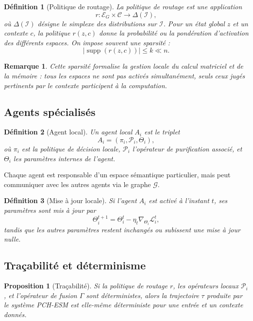 \documentclass[11pt,a4paper]{article}
\newtheorem{definition}{Définition}[section]
\newtheorem{proposition}{Proposition}[section]
\newtheorem{remark}{Remarque}[section]
\DeclareMathOperator{\supp}{supp}
\newcommand{\C}{\mathcal C}
\newcommand{\E}{\mathcal E}
\newcommand{\I}{\mathcal I}
\newcommand{\Pcal}{\mathcal P}
\newcommand{\Gcal}{\mathcal G}
\newcommand{\1}{\mathbf 1}
\begin{document}
\begin{definition}[Politique de routage]
La politique de routage est une application
\[
r:\E_G\times\C\to\Delta(\I),
\]
où \(\Delta(\I)\) désigne le simplexe des distributions sur \(\I\).
Pour un état global \(z\) et un contexte \(c\), la politique \(r(z,c)\) donne la probabilité ou la pondération d'activation des différents espaces.
On impose souvent une sparsité :
\[
|\supp(r(z,c))|\le k\ll n.
\]
\end{definition}

\begin{remark}
Cette sparsité formalise la gestion locale du calcul matriciel et de la mémoire : tous les espaces ne sont pas activés simultanément, seuls ceux jugés pertinents par le contexte participent à la computation.
\end{remark}

\subsection{Agents spécialisés}

\begin{definition}[Agent local]
Un agent local \(A_i\) est le triplet
\[
A_i=(\pi_i,\Pcal_i,\Theta_i),
\]
où \(\pi_i\) est la politique de décision locale, \(\Pcal_i\) l'opérateur de purification associé, et \(\Theta_i\) les paramètres internes de l'agent.
\end{definition}

Chaque agent est responsable d'un espace sémantique particulier, mais peut communiquer avec les autres agents via le graphe \(\Gcal\).

\begin{definition}[Mise à jour locale]
Si l'agent \(A_i\) est activé à l'instant \(t\), ses paramètres sont mis à jour par
\[
\Theta_i^{t+1}
=
\Theta_i^t
-
\eta_t \nabla_{\Theta_i}\mathcal L_i^t,
\]
tandis que les autres paramètres restent inchangés ou subissent une mise à jour nulle.
\end{definition}

\subsection{Traçabilité et déterminisme}

\begin{proposition}[Traçabilité]
Si la politique de routage \(r\), les opérateurs locaux \(\Pcal_i\), et l'opérateur de fusion \(\Gamma\) sont déterministes, alors la trajectoire \(\tau\) produite par le système PCH-ESM est elle-même déterministe pour une entrée et un contexte donnés.
\end{proposition}
\end{document}
